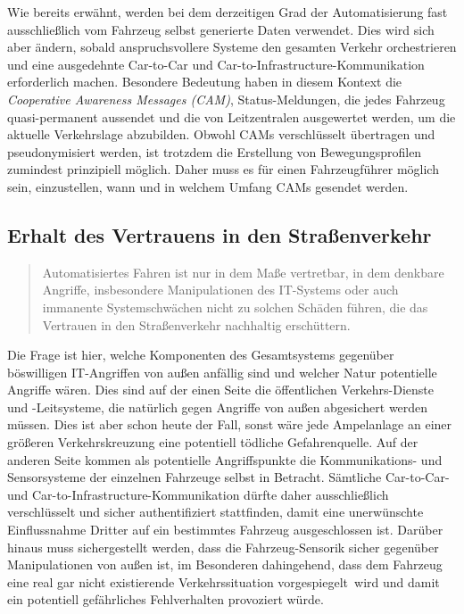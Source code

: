\documentclass[twoside,a4paper,12pt]{article}
\begin{document}
Wie bereits erwähnt, werden bei dem derzeitigen Grad der Automatisierung fast ausschließlich vom Fahrzeug selbst generierte Daten verwendet.
Dies wird sich aber ändern, sobald anspruchsvollere Systeme den gesamten Verkehr orchestrieren und eine ausgedehnte Car-to-Car und 
Car-to-Infrastructure-Kommunikation erforderlich machen. Besondere Bedeutung haben in diesem Kontext die \textit{Cooperative Awareness Messages (CAM)},
Status-Meldungen, die jedes Fahrzeug quasi-permanent aussendet und die von Leitzentralen ausgewertet werden, um die aktuelle Verkehrslage abzubilden.
Obwohl CAMs verschlüsselt übertragen und pseudonymisiert werden, ist trotzdem die Erstellung von Bewegungsprofilen zumindest prinzipiell möglich.
Daher muss es für einen Fahrzeugführer möglich sein, einzustellen, wann und in welchem Umfang CAMs gesendet werden.

\subsection{Erhalt des Vertrauens in den Straßenverkehr} \label{ErhaltDesVertrauensInDenStrassenverkehr}

\begin{quote}
\glqq
Automatisiertes Fahren ist nur in dem Maße vertretbar, in dem denkbare Angriffe, insbesondere Manipulationen des 
IT-Systems oder auch immanente Systemschwächen nicht
zu solchen Schäden führen, die das Vertrauen in den Straßenverkehr nachhaltig erschüttern.\grqq\mbox{~\cite[S. 12]{ek}}
\end{quote}

Die Frage ist hier, welche Komponenten des Gesamtsystems  gegenüber böswilligen IT-Angriffen von außen anfällig sind und welcher Natur potentielle Angriffe
wären. Dies sind auf der einen Seite die öffentlichen Verkehrs-Dienste und -Leitsysteme, die natürlich gegen Angriffe von außen abgesichert werden müssen. 
Dies ist aber schon heute der Fall, sonst wäre jede Ampelanlage an einer größeren Verkehrskreuzung eine potentiell tödliche Gefahrenquelle. Auf der anderen Seite kommen als potentielle Angriffspunkte die Kommunikations- und Sensorsysteme der einzelnen Fahrzeuge selbst in Betracht. Sämtliche Car-to-Car- und Car-to-Infrastructure-Kommunikation dürfte daher ausschließlich verschlüsselt und sicher authentifiziert stattfinden, damit eine unerwünschte Einflussnahme Dritter auf ein bestimmtes Fahrzeug ausgeschlossen ist. Darüber hinaus muss sichergestellt werden, dass die Fahrzeug-Sensorik sicher gegenüber Manipulationen von außen ist, 
im Besonderen dahingehend, dass dem Fahrzeug eine real gar nicht existierende Verkehrssituation \glqq vorgespiegelt\grqq\ wird und damit ein potentiell 
gefährliches Fehlverhalten provoziert würde.
\end{document}
